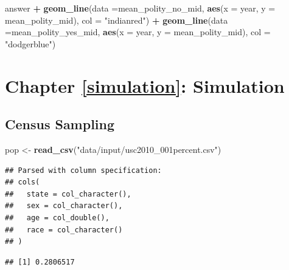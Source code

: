 \documentclass[
]{book}
\newenvironment{Shaded}{\begin{snugshade}}{\end{snugshade}}
\newcommand{\DataTypeTok}[1]{\textcolor[rgb]{0.13,0.29,0.53}{#1}}
\newcommand{\KeywordTok}[1]{\textcolor[rgb]{0.13,0.29,0.53}{\textbf{#1}}}
\newcommand{\NormalTok}[1]{#1}
\newcommand{\OperatorTok}[1]{\textcolor[rgb]{0.81,0.36,0.00}{\textbf{#1}}}
\newcommand{\StringTok}[1]{\textcolor[rgb]{0.31,0.60,0.02}{#1}}
\theoremstyle{definition}
\theoremstyle{definition}
\theoremstyle{definition}
\theoremstyle{remark}
\begin{document}
\begin{Shaded}
\begin{Highlighting}[]
\NormalTok{answer }\OperatorTok{+}\StringTok{ }\KeywordTok{geom\_line}\NormalTok{(}\DataTypeTok{data =}\NormalTok{mean\_polity\_no\_mid, }\KeywordTok{aes}\NormalTok{(}\DataTypeTok{x =}\NormalTok{ year, }\DataTypeTok{y =}\NormalTok{ mean\_polity\_mid), }\DataTypeTok{col =} \StringTok{"indianred"}\NormalTok{) }\OperatorTok{+}\StringTok{ }\KeywordTok{geom\_line}\NormalTok{(}\DataTypeTok{data =}\NormalTok{mean\_polity\_yes\_mid, }\KeywordTok{aes}\NormalTok{(}\DataTypeTok{x =}\NormalTok{ year, }\DataTypeTok{y =}\NormalTok{ mean\_polity\_mid), }\DataTypeTok{col =} \StringTok{"dodgerblue"}\NormalTok{)}
\end{Highlighting}
\end{Shaded}

\hypertarget{chapter-refsimulation-simulation}{%
\section{Chapter \ref{simulation}: Simulation}\label{chapter-refsimulation-simulation}}

\hypertarget{census-sampling-1}{%
\subsection{Census Sampling}\label{census-sampling-1}}

\begin{Shaded}
\begin{Highlighting}[]
\NormalTok{pop <{-}}\StringTok{ }\KeywordTok{read\_csv}\NormalTok{(}\StringTok{"data/input/usc2010\_001percent.csv"}\NormalTok{)}
\end{Highlighting}
\end{Shaded}

\begin{verbatim}
## Parsed with column specification:
## cols(
##   state = col_character(),
##   sex = col_character(),
##   age = col_double(),
##   race = col_character()
## )
\end{verbatim}

\begin{Shaded}
\end{Shaded}

\begin{verbatim}
## [1] 0.2806517
\end{verbatim}
\end{document}
